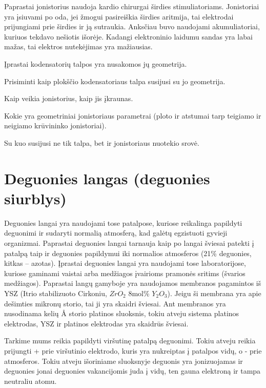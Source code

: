 Paprastai jonistorius naudoja kardio chirurgai širdies stimuliatoriams.
Jonistoriai yra įsiuvami po oda, jei žmogui pasireiškia širdies aritmija,
tai elektrodai prijungiami prie širdies ir ją sutraukia. Anksčiau
buvo naudojami akumuliatoriai, kuriuos tekdavo nešiotis išorėje.
Kadangi elektroninio laidumu sandas yra labai mažas, tai elektros
nutekėjimas yra mažiausias.

\begin{remember}
  \item Įprastai kodensatorių talpos yra nusakomos jų geometrija.
  \item Prisiminti kaip plokščio kodensatoriaus talpa susijusi su
    jo geometrija.
  \item Kaip veikia jonistorius, kaip jis įkraunas.
  \item Kokie yra geometriniai jonistoriaus parametrai (ploto ir atstumai
    tarp teigiamo ir neigiamo krūvininko jonistoriai).
  \item Su kuo susijusi ne tik talpa, bet ir jonistoriaus nuotekio
    srovė.
\end{remember}

\section{Deguonies langas (deguonies siurblys)}

Deguonies langai yra naudojami tose patalpose, kuriose reikalinga
papildyti deguonimi ir sudaryti normalią atmosferą, kad galėtų
egzistuoti gyvieji organizmai. Paprastai deguonies langai tarnauja
kaip po langai šviesai patekti į patalpą taip ir deguonies papildymui
iki normalios atmosferos (21\% deguonies, kitkas – azotas). Įprastai
deguonies langai yra naudojami tose laboratorijose, kuriose gaminami
vaistai arba medžiagos įvairioms pramonės sritims (švarios medžiagos).
Paprastai langų gamyboje yra naudojamos membranos pagamintos iš
YSZ (Itrio stabilizuoto Cirkoniu, $ZrO_{2}$ 8mol\% $Y_2O_{3}$). Jeigu
ši membrana yra apie dešimties mikronų storio, tai ji yra skaidri
šviesai. Ant membranos yra nusodinama kelių Å storio platinos sluoksnis,
tokiu atveju sistema platinos elektrodas, YSZ ir platinos elektrodas
yra skaidrūs šviesai.

 Tarkime mums reikia papildyti viršutinę patalpą deguonimi.
Tokiu atveju reikia prijungti + prie viršutinio elektrodo, kuris
yra nukreiptas į patalpos vidų, o - prie atmosferos. Tokiu atveju
išoriniame sluoksnyje deguonis yra jonizuojamas ir deguonies jonai
deguonies vakancijomis juda į vidų, ten gauna elektroną ir tampa
neutraliu atomu.

